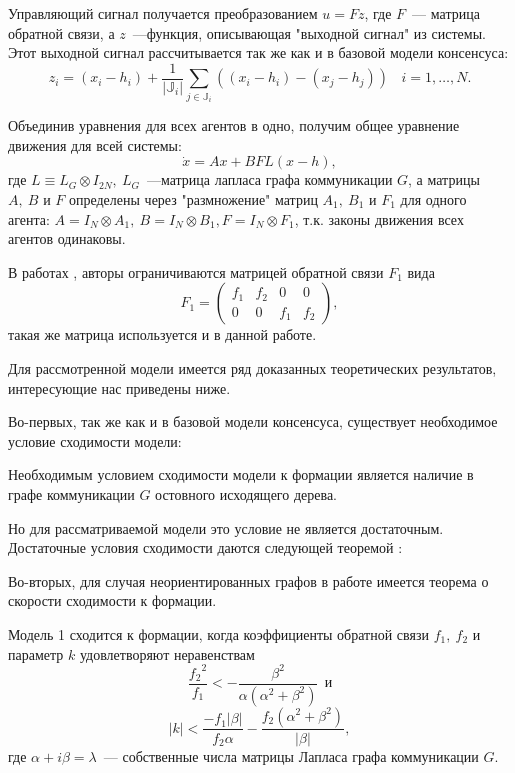 Управляющий сигнал получается преобразованием $u=Fz$, где $F$~--- матрица обратной связи, а $z$~---функция, описывающая "выходной сигнал" из системы. Этот выходной сигнал рассчитывается так же как и в базовой модели консенсуса:
$$
z_i=(x_i-h_i)+\frac{1}{|\mathbb{J}_i|}\sum_{j\in\mathbb{J}_i}\left((x_i-h_i)-(x_j-h_j)\right)\ \ \ \ i=1,\ldots,N.
$$

Объединив уравнения для всех агентов в одно, получим общее уравнение движения для всей системы:
\begin{equation}
\dot{x}=Ax+BFL(x-h),
\label{eq:linear-motion}
\end{equation}
где $L\equiv L_G\otimes I_{2N},\ L_G$~---матрица лапласа графа коммуникации $G$, а матрицы $A,\ B$ и $F$ определены через "размножение" матриц $A_1,\ B_1$ и $F_1$ для одного агента: $A=I_N\otimes A_1,\ B=I_N\otimes B_1, F=I_N\otimes F_1$, т.к. законы движения всех агентов одинаковы.

В работах \cite{veerman2005flocks}, \cite{lafferriere2005decentralized} авторы ограничиваются матрицей обратной связи $F_1$ вида 
$$F_1=\left( \begin{array}{cccc}
f_1 & f_2 & 0 & 0 \\
0 & 0 & f_1 & f_2 \end{array} \right),$$ такая же матрица используется и в данной работе.

Для рассмотренной модели имеется ряд доказанных теоретических результатов, интересующие нас приведены ниже. 

Во-первых, так же как и в базовой модели консенсуса, существует необходимое условие сходимости модели:
\begin{proposition}
Необходимым условием сходимости модели к формации является наличие в графе коммуникации $G$ остовного исходящего дерева.
\end{proposition}

Но для рассматриваемой модели это условие не является достаточным. Достаточные условия сходимости даются следующей теоремой \cite{veerman2005flocks,lafferriere2005decentralized}:

Во-вторых, для случая неориентированных графов в работе \cite{lafferriere2005decentralized} имеется теорема о скорости сходимости к формации.
\begin{theorem}
Модель 1 сходится к формации, когда коэффициенты обратной связи $f_1,\ f_2$ и параметр $k$ удовлетворяют неравенствам 
\begin{equation}
\frac{{f_2}^2}{f_1}< -\frac{\beta^2}{\alpha(\alpha^2+\beta^2)}\ \ \text{и}
\end{equation}
\begin{equation}
|k|<\frac{-f_1|\beta|}{f_2\alpha}-\frac{f_2(\alpha^2+\beta^2)}{|\beta|},
\end{equation}
где $\alpha+i\beta=\lambda$~--- собственные числа матрицы Лапласа графа коммуникации $G$.
\end{theorem}

